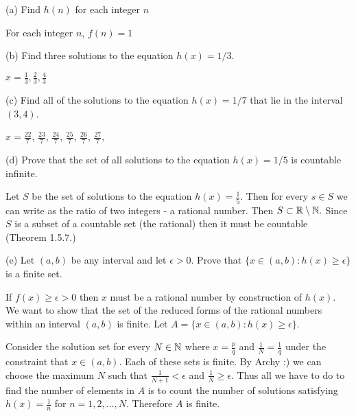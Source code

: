 \documentclass{report}
\begin{document}
\bigskip
(a) Find $h(n)$ for each integer $n$

\sol For each integer $n$, $f(n)=1$
\bigskip

(b) Find three solutions to the equation $h(x)=1 / 3$.

\sol $ x = \frac{1}{3}, \frac{2}{3}, \frac{4}{3}$

\bigskip
(c) Find all of the solutions to the equation $h(x)=1 / 7$ that lie in the interval $(3,4)$.

\sol $x = \frac{22}{7}$, $\frac{23}{7}$, $\frac{24}{7}$, $\frac{25}{7}$, $\frac{26}{7}$, $\frac{27}{7}$,

\bigskip
(d) Prove that the set of all solutions to the equation $h(x)=1 / 5$ is countable infinite.

\sol
\begin{myproof}
    Let $S$ be the set of solutions to the equation $h(x)= \frac{1}{5}.$ Then for every $s \in S$ we can write as the ratio of two integers - a rational number. Then $S \subset \RR \setminus \NN.$ Since $S$ is a subset of a countable set (the rational) then it must be countable (Theorem 1.5.7.) 
\end{myproof}
\bigskip
(e) Let $(a, b)$ be any interval and let $\epsilon>0$. Prove that $\{x \in(a, b): h(x) \geq \epsilon\}$ is a finite set.
\par
\bigskip
\sol
If $f(x) \geq \epsilon > 0$ then $x$ must be a rational number by construction of $h(x).$  We want to show that the set of  the reduced forms of the rational numbers within an interval $(a,b)$ is finite. Let $A =\{x \in(a, b): h(x) \geq \epsilon\}.$
\par
Consider the solution set for every $N\in \NN$ where $x = \frac{p}{q}$ and $\frac{1}{N} = \frac{1}{q}$ under the constraint that $x \in (a,b)$.  Each of these sets is finite.  By Archy :) we can choose the maximum $N$ such that $\frac{1}{N+1} < \epsilon$ and $\frac{1}{N} \geq \epsilon.$ Thus all we have to do to find the number of elements in $A$ is to count the number of solutions satisfying $h(x) = \frac{1}{n}$ for $n = 1,2,\dots, N.$ Therefore  $A$ is finite.
 
\end{document}
